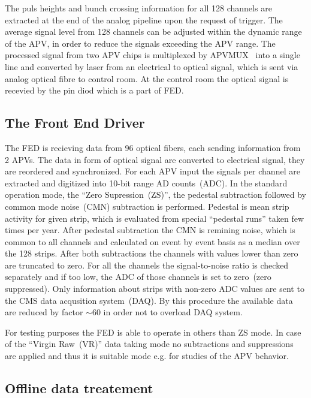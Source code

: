The puls heights and bunch crossing information for all 128 channels are extracted at the end of the analog pipeline upon the request of trigger. The average signal level from 128 channels can be adjusted within the dynamic range of the APV, in order to reduce the signals exceeding the APV range. The processed signal from two APV chips is multiplexed by APVMUX~\cite{Ball:2007zza} into a single line and converted by laser from an electrical to optical signal, which is sent via analog optical fibre to control room. At the control room the optical signal is recevied by the pin diod which is a part of FED.



\subsection{The Front End Driver}

The FED is recieving data from 96 optical fibers, each sending information from 2 APVs. The data in form of optical signal are converted to electrical signal, they are reordered and synchronized. For each APV input the signals per channel are extracted and digitized into 10-bit range AD counts~(ADC). In the standard operation mode, the ``Zero Supression~(ZS)'', the pedestal subtraction followed by common mode noise~(CMN) subtraction is performed. Pedestal is mean strip activity for given strip, which is evaluated from special ``pedestal runs'' taken few times per year. After pedestal subtraction the CMN is remining noise, which is common to all channels and calculated on event by event basis as a median over the 128 strips. After both subtractions the channels with values lower than zero are truncated to zero. For all the channels the signal-to-noise ratio is checked separately and if too low, the ADC of those channels is set to zero~(zero suppressed). Only information about strips with non-zero ADC values are sent to the CMS data acqusition system~(DAQ). By this procedure the available data are reduced by factor $\sim$60 in order not to overload DAQ system.


For testing purposes the FED is able to operate in others than ZS mode. In case of the ``Virgin Raw~(VR)'' data taking mode no subtractions and suppressions are applied and thus it is suitable mode e.g. for studies of the APV behavior.

\subsection{Offline data treatement}

